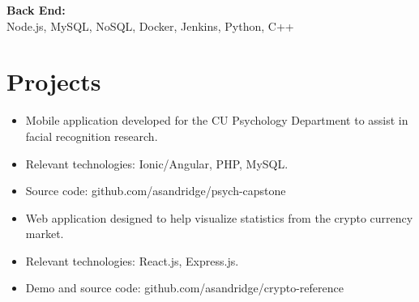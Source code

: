 \documentclass{resume}
\begin{document}
\bigskip
\textbf{Back End:} \\
Node.js, MySQL, NoSQL, Docker, Jenkins, Python, C++\\

\section{{\faFolder} Projects}
\begin{itemize}
  \item Mobile application developed for the CU Psychology Department to assist in facial recognition research.
  \item Relevant technologies: Ionic/Angular, PHP, MySQL.
  \item Source code: github.com/asandridge/psych-capstone
\end{itemize}
\bigskip
{}
\begin{itemize}
  \item Web application designed to help visualize statistics from the crypto currency market.
  \item Relevant technologies: React.js, Express.js.
  \item Demo and source code: github.com/asandridge/crypto-reference
\end{itemize}
\end{document}
